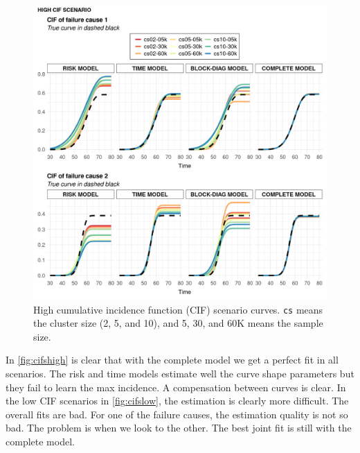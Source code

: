 \documentclass[a4paper,12pt]{article}
\begin{document}
\begin{figure}[H]
 \centering
 \includegraphics[width=\linewidth]{pics/cifs-1.png}
 \vspace{-0.75cm}
 \caption{High cumulative incidence function (CIF) scenario
   curves. \texttt{cs} means the cluster size (2, 5, and 10), and 5, 30,
   and 60K means the sample size.}
 \label{fig:cifshigh}
\end{figure}

In \autoref{fig:cifshigh} is clear that with the complete model we get a
perfect fit in all scenarios. The risk and time models estimate well the
curve shape parameters but they fail to learn the max incidence. A
compensation between curves is clear. In the low CIF scenarios in
\autoref{fig:cifslow}, the estimation is clearly more difficult. The
overall fits are bad. For one of the failure causes, the estimation
quality is not so bad. The problem is when we look to the other. The
best joint fit is still with the complete model.
\end{document}
